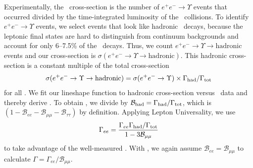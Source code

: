 \documentclass{cornell}
\begin{document}
Experimentally, the \ups\ cross-section is the number of $e^+e^- \to
\Upsilon$ events that occurred divided by the time-integrated
luminosity of the \ee\ collisions.  To identify $e^+e^- \to \Upsilon$
events, we select events that look like hadronic \ups\ decays, because
the leptonic final states are hard to distinguish from continuum
backgrounds and account for only 6--7.5\% of the \ups\ decays.  Thus,
we count $e^+e^- \to \Upsilon \to \mbox{hadronic}$ events and our
cross-section is $\sigma(e^+e^- \to \Upsilon \to \mbox{hadronic})$.
This hadronic cross-section is a constant multiple of the total
cross-section
\begin{equation}
  \sigma(e^+e^- \to \Upsilon \to \mbox{hadronic}) = \sigma(e^+e^- \to
  \Upsilon) \times \Gamma_{\mbox{\scriptsize had}} / \Gamma_{\mbox{\scriptsize tot}}
\end{equation}
for all \ecm.  We fit our lineshape function to hadronic cross-section
versus \ecm\ data and thereby derive \geehadtot.  To obtain \gee, we
divide by ${\mathcal B}_{\mbox{\scriptsize had}} =
\Gamma_{\mbox{\scriptsize had}}/\Gamma_{\mbox{\scriptsize tot}}$, which is $(1 - {\mathcal B}_{ee}
- {\mathcal B}_{\mu\mu} - {\mathcal B}_{\tau\tau})$ by definition.
Applying Lepton Universality, we use
\begin{equation}
  \Gamma_{ee} = \frac{\Gamma_{ee}\Gamma_{\mbox{\scriptsize had}}/\Gamma_{\mbox{\scriptsize tot}}}{1
  - 3 {\mathcal B}_{\mu\mu}}
  \label{eqn:geehadtot:to:gee}
\end{equation}
to take advantage of the well-measured \bmm.  With \gee, we again
assume ${\mathcal B}_{ee} = {\mathcal B}_{\mu\mu}$ to calculate
$\Gamma = \Gamma_{ee} / {\mathcal B}_{\mu\mu}$.
\end{document}
